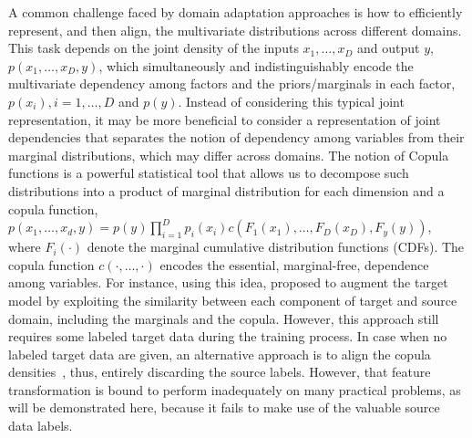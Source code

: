 \documentclass{article}
\begin{document}
   


    
A common challenge faced by domain adaptation approaches is how to efficiently represent, and then align, the multivariate distributions across different domains. This task depends on the joint density of the inputs $x_1,\ldots,x_D$ and output $y$, $p(x_1,\ldots,x_D,y)$, which simultaneously and indistinguishably encode the multivariate dependency among factors and the priors/marginals in each factor, $p(x_i), i=1,\ldots,D$ and $p(y)$.  Instead of considering this typical joint representation, it may be more beneficial to consider a representation of joint dependencies that separates the notion of dependency among variables from their marginal distributions, which may differ across domains. The notion of Copula functions \cite{DBLP:journals/kybernetika/Sklar73} is a powerful statistical tool that allows us to decompose such distributions into a product of marginal distribution for each dimension and a copula function, $p(x_1,\ldots,x_d,y) = p(y) \prod_{i=1}^D p_{i}(x_i) c(F_1(x_1) ,\ldots,F_D(x_D),F_y(y))$, where $F_i(\cdot)$ denote the marginal cumulative distribution functions (CDFs). The copula function $c(\cdot,\ldots,\cdot)$ encodes the essential, marginal-free, dependence among variables. For instance, using this idea, \cite{DBLP:journals/corr/abs-1301-0142} proposed to augment the target model by exploiting the similarity between each component of target and source domain, including the marginals and the copula. However, this approach still requires some labeled target data during the training process. In case when no labeled target data are given, an alternative approach is to align the copula densities~\cite{DBLP:dblp_conf/icassp/BayestehtashkSB16}, thus, entirely discarding the source labels. However, that feature transformation is bound to perform inadequately on many practical problems, as will be demonstrated here, because it fails to make use of the valuable source data labels. 
    
\end{document}
